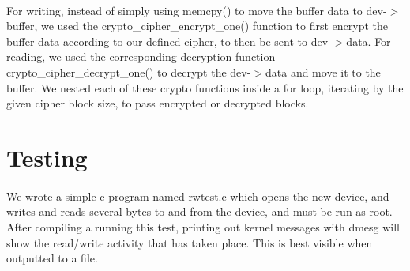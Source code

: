\documentclass[letterpaper,10pt]{article}
\begin{document}
\paragraph{} 
For writing, instead of simply using memcpy() to move the buffer data to dev-$>$buffer, we used the crypto\_cipher\_encrypt\_one() function to first encrypt the buffer data according to our defined cipher, to then be sent to dev-$>$data. For reading, we used the corresponding decryption function crypto\_cipher\_decrypt\_one() to decrypt the dev-$>$data and move it to the buffer. We nested each of these crypto functions inside a for loop, iterating by the given cipher block size, to pass encrypted or decrypted blocks.

\section*{Testing}
\paragraph{} 
We wrote a simple c program named rwtest.c which opens the new device, and writes and reads several bytes to and from the device, and must be run as root. After compiling a running this test, printing out kernel messages with dmesg will show the read/write activity that has taken place. This is best visible when outputted to a file.
\end{document}
